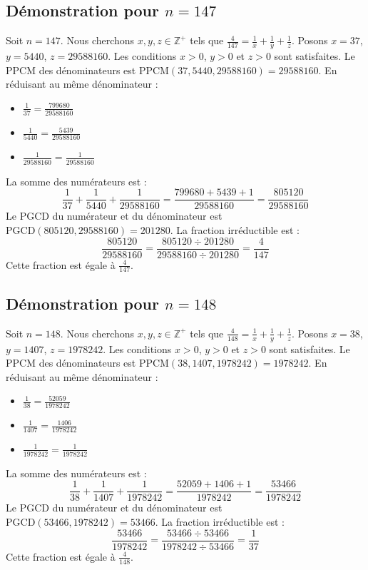 \documentclass[11pt,a4paper]{article}
\begin{document}
\subsection{Démonstration pour $n = 147$}
Soit $n = 147$. Nous cherchons $x, y, z \in \mathbb{Z}^{+}$ tels que $\frac{4}{147} = \frac{1}{x} + \frac{1}{y} + \frac{1}{z}$.
Posons $x = 37$, $y = 5440$, $z = 29588160$.
Les conditions $x > 0$, $y > 0$ et $z > 0$ sont satisfaites.
Le PPCM des dénominateurs est $\text{PPCM}(37, 5440, 29588160) = 29588160$.
En réduisant au même dénominateur :
\begin{itemize}
    \item $\frac{1}{37} = \frac{799680}{29588160}$
    \item $\frac{1}{5440} = \frac{5439}{29588160}$
    \item $\frac{1}{29588160} = \frac{1}{29588160}$
\end{itemize}
La somme des numérateurs est :
$$ \frac{1}{37} + \frac{1}{5440} + \frac{1}{29588160} = \frac{799680 + 5439 + 1}{29588160} = \frac{805120}{29588160} $$
Le PGCD du numérateur et du dénominateur est $\text{PGCD}(805120, 29588160) = 201280$.
La fraction irréductible est :
$$ \frac{805120}{29588160} = \frac{805120 \div 201280}{29588160 \div 201280} = \frac{4}{147} $$
Cette fraction est égale à $\frac{4}{147}$.

\subsection{Démonstration pour $n = 148$}
Soit $n = 148$. Nous cherchons $x, y, z \in \mathbb{Z}^{+}$ tels que $\frac{4}{148} = \frac{1}{x} + \frac{1}{y} + \frac{1}{z}$.
Posons $x = 38$, $y = 1407$, $z = 1978242$.
Les conditions $x > 0$, $y > 0$ et $z > 0$ sont satisfaites.
Le PPCM des dénominateurs est $\text{PPCM}(38, 1407, 1978242) = 1978242$.
En réduisant au même dénominateur :
\begin{itemize}
    \item $\frac{1}{38} = \frac{52059}{1978242}$
    \item $\frac{1}{1407} = \frac{1406}{1978242}$
    \item $\frac{1}{1978242} = \frac{1}{1978242}$
\end{itemize}
La somme des numérateurs est :
$$ \frac{1}{38} + \frac{1}{1407} + \frac{1}{1978242} = \frac{52059 + 1406 + 1}{1978242} = \frac{53466}{1978242} $$
Le PGCD du numérateur et du dénominateur est $\text{PGCD}(53466, 1978242) = 53466$.
La fraction irréductible est :
$$ \frac{53466}{1978242} = \frac{53466 \div 53466}{1978242 \div 53466} = \frac{1}{37} $$
Cette fraction est égale à $\frac{4}{148}$.
\end{document}
